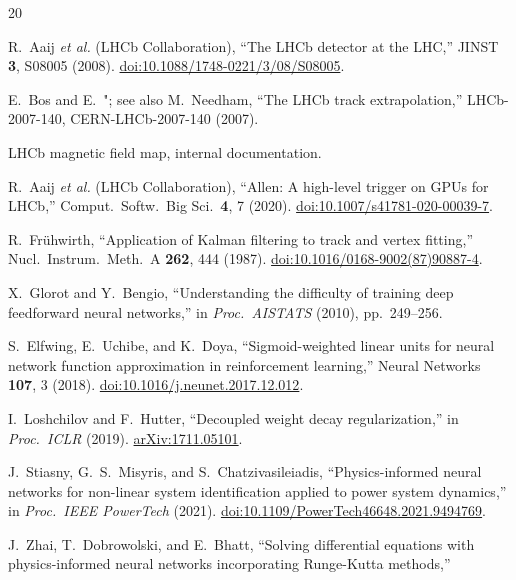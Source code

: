 \documentclass[a4paper,11pt]{article}
\begin{document}
\begin{thebibliography}{20}

R.~Aaij \textit{et al.} (LHCb Collaboration),
``The LHCb detector at the LHC,''
JINST \textbf{3}, S08005 (2008).
\href{https://doi.org/10.1088/1748-0221/3/08/S08005}{doi:10.1088/1748-0221/3/08/S08005}.

E.~Bos and E.~"; see also
M.~Needham,
``The LHCb track extrapolation,''
LHCb-2007-140, CERN-LHCb-2007-140 (2007).

LHCb magnetic field map, internal documentation.

R.~Aaij \textit{et al.} (LHCb Collaboration),
``Allen: A high-level trigger on GPUs for LHCb,''
Comput.\ Softw.\ Big Sci.\ \textbf{4}, 7 (2020).
\href{https://doi.org/10.1007/s41781-020-00039-7}{doi:10.1007/s41781-020-00039-7}.

R.~Fr\"uhwirth,
``Application of Kalman filtering to track and vertex fitting,''
Nucl.\ Instrum.\ Meth.\ A \textbf{262}, 444 (1987).
\href{https://doi.org/10.1016/0168-9002(87)90887-4}{doi:10.1016/0168-9002(87)90887-4}.

X.~Glorot and Y.~Bengio,
``Understanding the difficulty of training deep feedforward neural networks,''
in \textit{Proc.\ AISTATS} (2010), pp.~249--256.

S.~Elfwing, E.~Uchibe, and K.~Doya,
``Sigmoid-weighted linear units for neural network function approximation
in reinforcement learning,''
Neural Networks \textbf{107}, 3 (2018).
\href{https://doi.org/10.1016/j.neunet.2017.12.012}{doi:10.1016/j.neunet.2017.12.012}.

I.~Loshchilov and F.~Hutter,
``Decoupled weight decay regularization,''
in \textit{Proc.\ ICLR} (2019).
\href{https://arxiv.org/abs/1711.05101}{arXiv:1711.05101}.

J.~Stiasny, G.~S.~Misyris, and S.~Chatzivasileiadis,
``Physics-informed neural networks for non-linear system identification
applied to power system dynamics,''
in \textit{Proc.\ IEEE PowerTech} (2021).
\href{https://doi.org/10.1109/PowerTech46648.2021.9494769}{doi:10.1109/PowerTech46648.2021.9494769}.

J.~Zhai, T.~Dobrowolski, and E.~Bhatt,
``Solving differential equations with physics-informed neural networks
incorporating Runge-Kutta methods,''


\end{thebibliography}
\end{document}
